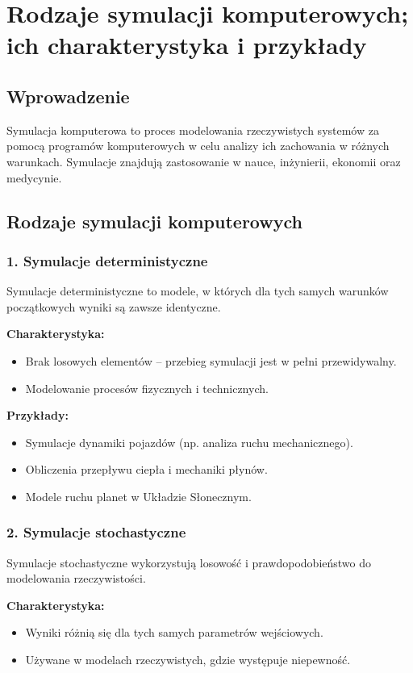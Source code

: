 \section{Rodzaje symulacji komputerowych; ich charakterystyka i przykłady}

\subsection{Wprowadzenie}
Symulacja komputerowa to proces modelowania rzeczywistych systemów za pomocą programów komputerowych w celu analizy ich zachowania w różnych warunkach. Symulacje znajdują zastosowanie w nauce, inżynierii, ekonomii oraz medycynie.

\subsection{Rodzaje symulacji komputerowych}

\subsubsection{1. Symulacje deterministyczne}
Symulacje deterministyczne to modele, w których dla tych samych warunków początkowych wyniki są zawsze identyczne.

\textbf{Charakterystyka:}
\begin{itemize}
    \item Brak losowych elementów – przebieg symulacji jest w pełni przewidywalny.
    \item Modelowanie procesów fizycznych i technicznych.
\end{itemize}

\textbf{Przykłady:}
\begin{itemize}
    \item Symulacje dynamiki pojazdów (np. analiza ruchu mechanicznego).
    \item Obliczenia przepływu ciepła i mechaniki płynów.
    \item Modele ruchu planet w Układzie Słonecznym.
\end{itemize}

\subsubsection{2. Symulacje stochastyczne}
Symulacje stochastyczne wykorzystują losowość i prawdopodobieństwo do modelowania rzeczywistości.

\textbf{Charakterystyka:}
\begin{itemize}
    \item Wyniki różnią się dla tych samych parametrów wejściowych.
    \item Używane w modelach rzeczywistych, gdzie występuje niepewność.
\end{itemize}

